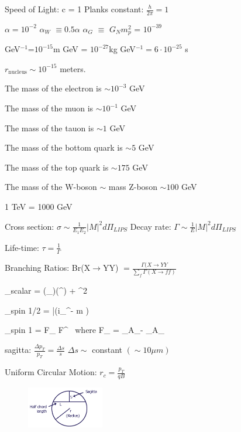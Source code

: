 {\large

Speed of Light: c = 1  \hspace{1in} Planks constant: $\frac{h}{2\pi} = 1$

$\alpha = 10^{-2}$  \hspace{1in} $\alpha_W$ $\equiv 0.5 \alpha$ \hspace{1in} $\alpha_G$ $\equiv$ $G_N m_p^2$ = $10^{-39}$

GeV$^{-1}$=$10^{-15}$m  \hspace{1in} GeV = $10^{-27}$kg \hspace{1in}   GeV$^{-1} = 6 \cdot 10^{-25}$ s

$r_\textrm{nucleus} \sim 10^{-15}$ meters.

The mass of the electron is $\sim 10^{-3}$ GeV

The mass of the muon is $\sim 10^{-1}$ GeV

The mass of the tauon is $\sim 1$ GeV

The mass of the bottom quark is $\sim 5$ GeV

The mass of the top quark is $\sim 175$ GeV

The mass of the W-boson $\sim$ mass Z-boson $\sim 100$ GeV

1 TeV = 1000 GeV

Cross section: $\sigma \sim \frac{1}{E_1 E_2}|M|^2 d\Pi_{LIPS}$  \hspace{1in} Decay rate: $\Gamma \sim \frac{1}{E} |M|^2 d\Pi_{LIPS}$

Life-time: $\tau = \frac{1}{\Gamma}$

Branching Ratios:  Br(X$\rightarrow$YY) $= \frac{\Gamma(X\rightarrow YY}{\sum_f \Gamma(X\rightarrow ff)}$

\be
{}_{scalar} =  (\partial_\mu \phi)(\partial^\mu \phi) +  \phi^2
\ee

\be
{}_{spin 1/2} = \bar{\psi}(i\gamma_\mu \partial^\mu - m )\psi
\ee

\be
{}_{spin 1} = F_{\mu\nu} F^{\mu\nu}\ \textrm{ where } F_{\mu\nu} = \partial_\mu A_\nu - \partial_\mu A_\nu
\ee

sagitta:  $\frac{\Delta p_T}{p_T} = \frac{\Delta s}{s}$  \hspace{1in} $\Delta s \sim $ constant $ (\sim 10 \mu m)$ 

Uniform Circular Motion: $r_c = \frac{p_T}{qB}$ 

\begin{figure}[h!]
\centering
\includegraphics[width=0.3\textwidth]{./Sagitta.png}
\end{figure}

}






